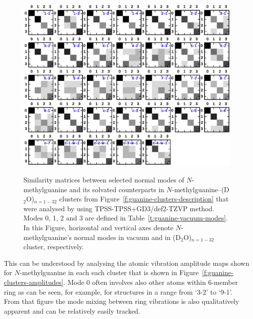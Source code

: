 \documentclass[b5paper,oneside,fleqn,11pt]{book}
\begin{document}
\begin{refsection}
\begin{figure}[t!]
{\includegraphics[width=0.94\linewidth]{u-mat.eps}
}
\caption{
Similarity matrices between selected normal modes of
$N$-methylguanine and its solvated counterparts
in $N$-methylguanine--(D$_2$O)$_{n=1-32}$ clusters from 
Figure~\ref{f:guanine-clusters-description} that were analysed
by using TPSS-TPSS+GD3/def2-TZVP method. Modes 0, 1, 2 and 3
are defined in Table~\ref{t:guanine-vacuum-modes}.
In this Figure, horizontal and vertical axes denote $N$-methylguanine's
normal modes in vacuum
and in (D$_2$O)$_{n=1-32}$ cluster, respectively.
\label{f:guanine-clusters-umat}}
\end{figure}
%
This can be understood 
by analysing the atomic vibration amplitude maps shown
for $N$-methylguanine in each each cluster
that is shown in Figure~\ref{f:guanine-clusters-amplitudes}.
Mode 0 often
involves also other atoms within 6-member ring as can be seen, for example,
for structures in a range from `3-2' to `9-1'. From that figure
the mode mixing between ring vibrations is also qualitatively
apparent and can be relatively easily tracked.
%
\begin{figure}[t!]
\centering
\setlength\fboxsep{0.4pt}
\setlength\fboxrule{0.5pt}
\end{figure}
\end{refsection}
\end{document}
